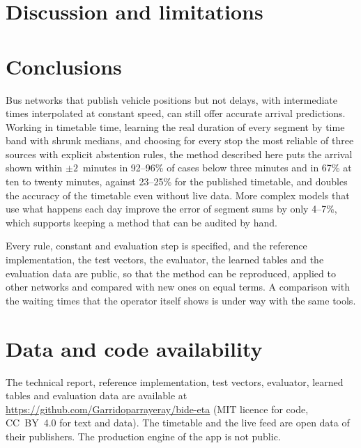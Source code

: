 \documentclass[preprint,11pt,nonatbib]{elsarticle}
\begin{document}
\section{Discussion and limitations}
\label{sec:discussion}



\section{Conclusions}
\label{sec:conclusions}

Bus networks that publish vehicle positions but not delays, with intermediate times interpolated at constant speed,
can still offer accurate arrival predictions. Working in timetable time, learning the real duration of every segment
by time band with shrunk medians, and choosing for every stop the most reliable of three sources with explicit
abstention rules, the method described here puts the arrival shown within $\pm2$~minutes in 92--96\% of cases below
three minutes and in 67\% at ten to twenty minutes, against 23--25\% for the published timetable, and doubles the
accuracy of the timetable even without live data. More complex models that use what happens each day improve the
error of segment sums by only 4--7\%, which supports keeping a method that can be audited by hand.

Every rule, constant and evaluation step is specified, and the reference implementation, the test vectors, the
evaluator, the learned tables and the evaluation data are public, so that the method can be reproduced, applied to
other networks and compared with new ones on equal terms. A comparison with the waiting times that the operator itself
shows is under way with the same tools.

\section*{Data and code availability}
The technical report, reference implementation, test vectors, evaluator, learned tables and evaluation data are
available at
\url{https://github.com/Garridoparrayeray/bide-eta} (MIT licence for code, CC~BY~4.0 for text and data). The
timetable and the live feed are open data of their publishers. The production engine of the app is not public.

\printbibliography

\appendix

\end{document}
